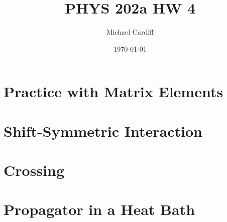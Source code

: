 \documentclass[12pt]{article}
\title{\vspace{-3em}PHYS 202a HW 4}
\author{Michael Cardiff}
\date{\today}
\begin{document}
\maketitle

\section{Practice with Matrix Elements}

\section{Shift-Symmetric Interaction}

\section{Crossing}

\section{Propagator in a Heat Bath}
\end{document}
